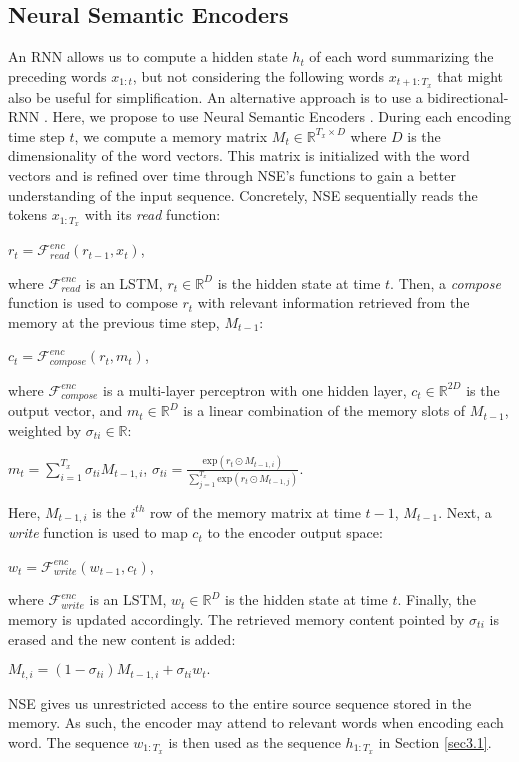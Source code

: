 \documentclass[11pt,a4paper]{article}
\begin{document}
\subsection{Neural Semantic Encoders}
An RNN allows us to compute a hidden state $h_t$ of each word summarizing the preceding words $x_{1:t}$, but not considering the following words $x_{t+1:T_x}$ that might also be useful for simplification. An alternative approach is to use a bidirectional-RNN \cite{Schuster:97}. Here, we propose to use Neural Semantic Encoders \cite[NSE,][]{Munkhdalai:17a}. During each encoding time step $t$, we compute a memory matrix $M_t \in \mathbb{R}^{T_x \times D}$ where $D$ is the dimensionality of the word vectors. This matrix is initialized with the word vectors and is refined over time through NSE's functions to gain a better understanding of the input sequence. Concretely, NSE sequentially reads the tokens $x_{1:T_x}$ with its \textit{read} function:
\begin{center}
$r_t = \mathcal{F^\textit{{enc}}_\textit{read}}(r_{t-1}, x_t)$, 
\end{center} 
where $\mathcal{F^\textit{{enc}}_\textit{read}}$ is an LSTM, $r_t \in \mathbb{R}^D$ is the hidden state at time $t$. Then, a \textit{compose} function is used to compose $r_t$ with relevant information retrieved from the memory at the previous time step, $M_{t-1}$:
\begin{center}
$c_t = \mathcal{F^\textit{{enc}}_\textit{compose}}(r_t, m_t)$, 
\end{center}
where $\mathcal{F^\textit{{enc}}_\textit{compose}}$ is a multi-layer perceptron with one hidden layer, $c_t \in \mathbb{R}^{2D}$ is the output vector, and $m_t \in \mathbb{R}^{D}$ is a linear combination of the memory slots of $M_{t-1}$, weighted by $\sigma_{ti} \in \mathbb{R}$:
\begin{center}
$m_t = \sum \limits_{i=1}^{T_x} \sigma_{ti}M_{t-1,i}$, \hspace*{5mm}
$\sigma_{ti} = \frac{\text{exp} (r_t \odot M_{t-1,i})}{ \sum\limits_{j=1}^{T_x} \text{exp} (r_t \odot M_{t-1,j})}.$
\end{center}
Here, $M_{t-1,i}$ is the $i^{th}$ row of the memory matrix at time $t-1$, $M_{t-1}$. Next, a \textit{write} function is used to map $c_t$ to the encoder output space:
\begin{center}
$w_t = \mathcal{F^\textit{{enc}}_\textit{write}}(w_{t-1}, c_t)$, 
\end{center}
where $\mathcal{F^\textit{{enc}}_\textit{write}}$ is an LSTM, $w_t \in \mathbb{R}^{D}$ is the hidden state at time $t$. Finally, the memory is updated accordingly. The retrieved memory content pointed by $\sigma_{ti}$ is erased and the new content is added:
\begin{center}
$M_{t,i} =  (1 - \sigma_{ti})M_{t-1,i} + \sigma_{ti}w_t.$
\end{center}
NSE gives us unrestricted access to the entire source sequence stored in the memory. As such, the encoder may attend to relevant words when encoding each word. The sequence $w_{1:T_x}$ is then used as the sequence $h_{1:T_x}$ in Section \ref{sec3.1}.
\end{document}
